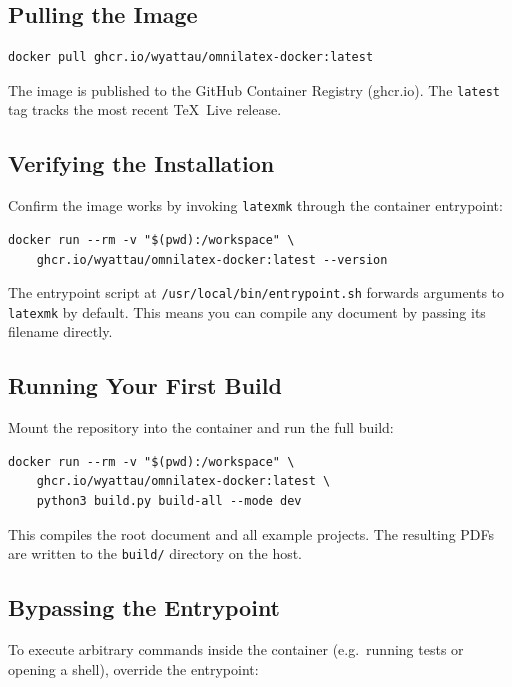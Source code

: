 \subsection{Pulling the Image}

\begin{verbatim}
docker pull ghcr.io/wyattau/omnilatex-docker:latest
\end{verbatim}

The image is published to the GitHub Container Registry (ghcr.io).  The
\texttt{latest} tag tracks the most recent TeX~Live release.

\subsection{Verifying the Installation}

Confirm the image works by invoking \texttt{latexmk} through the container
entrypoint:

\begin{verbatim}
docker run --rm -v "$(pwd):/workspace" \
    ghcr.io/wyattau/omnilatex-docker:latest --version
\end{verbatim}

The entrypoint script at \texttt{/usr/local/bin/entrypoint.sh} forwards
arguments to \texttt{latexmk} by default.  This means you can compile any
document by passing its filename directly.

\subsection{Running Your First Build}

Mount the repository into the container and run the full build:

\begin{verbatim}
docker run --rm -v "$(pwd):/workspace" \
    ghcr.io/wyattau/omnilatex-docker:latest \
    python3 build.py build-all --mode dev
\end{verbatim}

This compiles the root document and all example projects.  The resulting PDFs
are written to the \texttt{build/} directory on the host.

\subsection{Bypassing the Entrypoint}

To execute arbitrary commands inside the container (e.g.\ running tests or
opening a shell), override the entrypoint:


